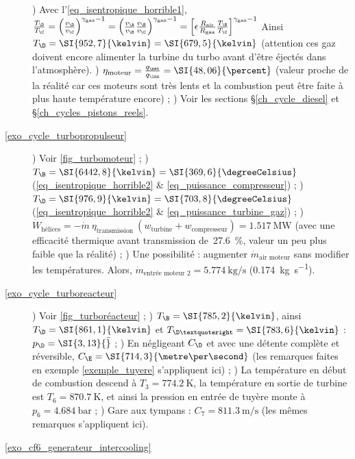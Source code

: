 \begin{description}
	 		) Avec l’\ref{eq_isentropique_horrible1}, $\frac{T_\D}{T_\C}
	 				= \left(\frac{v_\D}{v_\C}\right)^{\gamma_\text{gaz} - 1}
	 				= \left(\frac{v_\A}{v_\B} \frac{v_\B}{v_\C}\right)^{\gamma_\text{gaz} - 1}
	 				= \left[\epsilon \frac{R_\text{air}}{R_\text{gaz}} \frac{T_\B}{T_\C}\right]^{\gamma_\text{gaz} - 1}$
	 				Ainsi $T_\D = \SI{952,7}{\kelvin} = \SI{679,5}{\kelvin}$ (attention ces gaz doivent encore alimenter la turbine du turbo avant d’être éjectés dans l’atmosphère).
	 		) $\eta_\text{moteur} = \frac{q_\net}{q_\inn} = \SI{48,06}{\percent}$ (valeur proche de la réalité car ces moteurs sont très lents et la combustion peut être faite à plus haute température encore) ;
	 		) Voir les sections \S\ref{ch_cycle_diesel} et \S\ref{ch_cycles_pistons_reels}.
		\item [\ref{exo_cycle_turbopropulseur}]
			) Voir \cref{fig_turbomoteur} ;
	 		) $T_\B = \SI{6442,8}{\kelvin} = \SI{369,6}{\degreeCelsius}$ (\ref{eq_isentropique_horrible2} \& \ref{eq_puissance_compresseur}) ;
	 		) $T_\D = \SI{976,9}{\kelvin} = \SI{703,8}{\degreeCelsius}$ (\ref{eq_isentropique_horrible2} \& \ref{eq_puissance_turbine_gaz}) ;
	 		) $\dot W_\text{hélices} = - \dot m \ \eta_\text{transmission} \ (w_\text{turbine} + w_\text{compresseur}) = \SI{+1,517}{\mega\watt}$ (avec une efficacité thermique avant transmission de~\SI{27,6}{\percent}, valeur un peu plus faible que la réalité) ;
	 		) Une possibilité : augmenter $\dot m_\text{air moteur}$ sans modifier les températures. Alors, $\dot m_\text{entrée~moteur~2} = \SI{5,774}{\kilogram\per\second}$ (\SI{+0,174}{\kilogram\per\second}).
		\item [\ref{exo_cycle_turboreacteur}]
			) Voir \cref{fig_turboréacteur} ;
	 		) $T_\B = \SI{785,2}{\kelvin}$, ainsi $T_\D = \SI{861,1}{\kelvin}$ et $T_{\D’} = \SI{783,6}{\kelvin}$ : $p_\D = \SI{3,13}{\bar}$ ;
	 		) En négligeant $C_\D$ et avec une détente complète et réversible, $C_\E = \SI{714,3}{\metre\per\second}$ (les remarques faites en exemple \ref{exemple_tuyere} s’appliquent ici) ;
	 		) La température en début de combustion descend à $T_3 = \SI{774,2}{\kelvin}$, la température en sortie de turbine est $T_6 = \SI{870,7}{\kelvin}$, et ainsi la pression en entrée de tuyère monte à $p_6 = \SI{4,684}{\bar}$ ;
	 		) Gare aux tympans : $C_7= \SI{811,3}{\metre\per\second}$ (les mêmes remarques s’appliquent ici).
	 	\item [\ref{exo_cf6_generateur_intercooling}]

\end{description}
